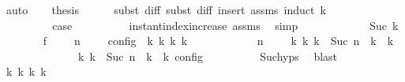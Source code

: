 \begin{isabellebody}
\ auto\isanewline
\ \ \isamarkupfalse%
\ {\isacharquery}thesis\isanewline
\ \ \ \ \isamarkupfalse%
\ {\isacharparenleft}subst\ diff{\isacharcomma}\ subst\ diff{\isacharcomma}\ insert\ assms{\isacharparenleft}{}{\isacharparenright}{\isacharcomma}\ induct\ {\isasymdelta}k{\isacharparenright}\isanewline
\ \ \ \ \ \ \isamarkupfalse%
\ {}\isanewline
\ \ \ \ \ \ \isamarkupfalse%
\ \isamarkupfalse%
\ {\isacharquery}case\isanewline
\ \ \ \ \ \ \ \ \isamarkupfalse%
\ instant{\isacharunderscore}index{\isacharunderscore}increase\ assms{\isacharparenleft}{}{\isacharparenright}\ \isamarkupfalse%
\ simp\isanewline
\ \ \ \ \isamarkupfalse%
\isanewline
\ \ \ \ \ \ \isamarkupfalse%
\ {\isacharparenleft}Suc\ {\isasymdelta}k{\isacharparenright}\isanewline
\ \ \ \ \ \ \isamarkupfalse%
\ f{}{\isacharcolon}\ {\isacartoucheopen}{\isasymrho}\ {\isasymin}\ {\isasymlbrakk}\ {\isasymGamma}{\isacharcomma}\ n\ {\isasymturnstile}\ {\isasymPsi}\ {\isasymtriangleright}\ {\isasymPhi}\ {\isasymrbrakk}\isactrlsub c\isactrlsub o\isactrlsub n\isactrlsub f\isactrlsub i\isactrlsub g\ {\isasymLongrightarrow}\ {\isasymexists}{\isasymGamma}\isactrlsub k\ {\isasymPsi}\isactrlsub k\ {\isasymPhi}\isactrlsub k\ k{\isachardot}\isanewline
\ \ \ \ \ \ \ \ \ \ \ {\isacharparenleft}{\isacharparenleft}{\isasymGamma}{\isacharcomma}\ n\ {\isasymturnstile}\ {\isasymPsi}\ {\isasymtriangleright}\ {\isasymPhi}{\isacharparenright}\ {\isasymhookrightarrow}\isactrlbsup k\isactrlesup \ {\isacharparenleft}{\isasymGamma}\isactrlsub k{\isacharcomma}\ {\isasymdelta}k\ {\isacharplus}\ Suc\ n\ {\isasymturnstile}\ {\isasymPsi}\isactrlsub k\ {\isasymtriangleright}\ {\isasymPhi}\isactrlsub k{\isacharparenright}{\isacharparenright}\isanewline
\ \ \ \ \ \ \ \ \ \ {\isasymand}\ {\isasymrho}\ {\isasymin}\ {\isasymlbrakk}\ {\isasymGamma}\isactrlsub k{\isacharcomma}\ {\isasymdelta}k\ {\isacharplus}\ Suc\ n\ {\isasymturnstile}\ {\isasymPsi}\isactrlsub k\ {\isasymtriangleright}\ {\isasymPhi}\isactrlsub k\ {\isasymrbrakk}\isactrlsub c\isactrlsub o\isactrlsub n\isactrlsub f\isactrlsub i\isactrlsub g{\isacartoucheclose}\isanewline
\ \ \ \ \ \ \ \ \isamarkupfalse%
\ Suc{\isachardot}hyps\ \isamarkupfalse%
\ blast\isanewline
\ \ \ \ \ \ \isamarkupfalse%
\ {\isasymGamma}\isactrlsub k\ {\isasymPsi}\isactrlsub k\ {\isasymPhi}\isactrlsub k\ k\isanewline

\end{isabellebody}
